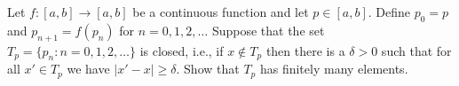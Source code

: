 \documentclass{article}
\begin{document}
\setlength{\parindent}{0pt}
Let $f:[a,b]\to[a,b]$ be a continuous function and let $p\in[a,b]$. Define $p_{0}=p$ and $p_{n+1}=f(p_{n})$ for $n=0,1,2,\dots$ Suppose that the set $T_{p}=\{p_{n}:n=0,1,2,\dots\}$ is closed, i.e., if $x\notin T_{p}$ then there is a $\delta>0$ such that for all $x'\in T_{p}$ we have $|x'-x|\ge\delta$. Show that $T_{p}$ has finitely many elements.
\end{document}
